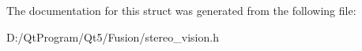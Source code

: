 The documentation for this struct was generated from the following file\+:\begin{DoxyCompactItemize}
\item 
D\+:/\+Qt\+Program/\+Qt5/\+Fusion/stereo\+\_\+vision.\+h\end{DoxyCompactItemize}
